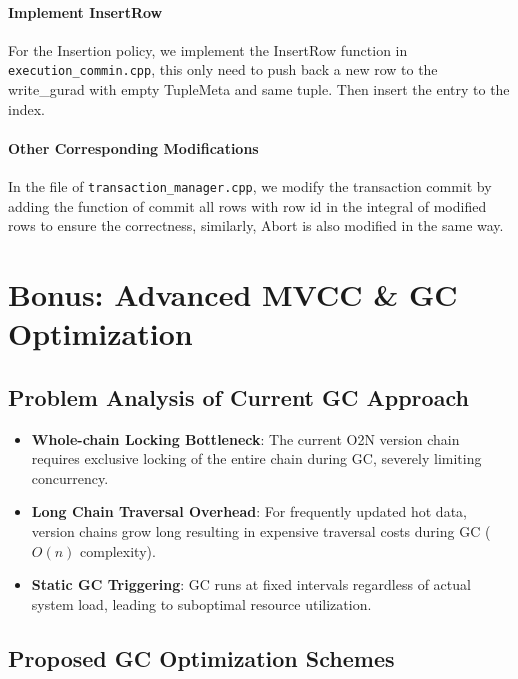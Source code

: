 \documentclass[a4 paper,12pt]{article}
\theoremstyle{definitionstyle}
\begin{document}
\paragraph{Implement InsertRow}
For the Insertion policy, we implement the InsertRow function in \texttt{execution\_commin.cpp}, this only need to push back a new row to the write\_gurad with empty TupleMeta and same tuple. Then insert the entry to the index.
\paragraph{Other Corresponding Modifications}
In the file of \texttt{transaction\_manager.cpp}, we modify the transaction commit by adding the function of commit all rows with row id in the integral of modified rows to ensure the correctness, similarly, Abort is also modified in the same way.\\
\section{Bonus: Advanced MVCC \& GC Optimization}

\subsection{Problem Analysis of Current GC Approach}
\begin{itemize}[leftmargin=*]
    \item \textbf{Whole-chain Locking Bottleneck}: 
    The current O2N version chain requires exclusive locking of the entire chain during GC, severely limiting concurrency.
    
    \item \textbf{Long Chain Traversal Overhead}: 
    For frequently updated hot data, version chains grow long resulting in expensive traversal costs during GC ($O(n)$ complexity).
    
    \item \textbf{Static GC Triggering}: 
    GC runs at fixed intervals regardless of actual system load, leading to suboptimal resource utilization.
\end{itemize}

\subsection{Proposed GC Optimization Schemes}
\end{document}

